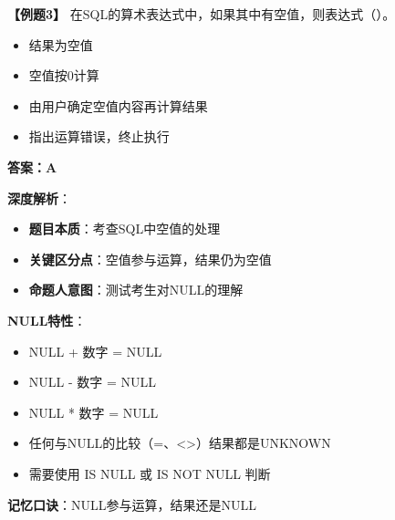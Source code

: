 \documentclass[12pt, a4paper]{article}
\newenvironment{bluebox}[1]{%
  \begin{trivlist}
  \item[\hskip\labelsep \textbf{#1}]
  \setlength{\parskip}{0.5ex}
  \setlength{\itemsep}{0.5ex}
}{%
  \end{trivlist}
}
\begin{document}
\begin{bluebox}{例题3：空值处理}
	\textbf{【例题3】} 在SQL的算术表达式中，如果其中有空值，则表达式（\quad）。

	\begin{itemize}
		\item[A)] 结果为空值
		\item[B)] 空值按0计算
		\item[C)] 由用户确定空值内容再计算结果
		\item[D)] 指出运算错误，终止执行
	\end{itemize}

	\textbf{答案：A}

	\textbf{深度解析}：

	\begin{itemize}
		\item \textbf{题目本质}：考查SQL中空值的处理
		\item \textbf{关键区分点}：空值参与运算，结果仍为空值
		\item \textbf{命题人意图}：测试考生对NULL的理解
	\end{itemize}

	\textbf{NULL特性}：
	\begin{itemize}
		\item NULL + 数字 = NULL
		\item NULL - 数字 = NULL
		\item NULL * 数字 = NULL
		\item 任何与NULL的比较（=、<>）结果都是UNKNOWN
		\item 需要使用 IS NULL 或 IS NOT NULL 判断
	\end{itemize}

	\textbf{记忆口诀}：NULL参与运算，结果还是NULL
\end{bluebox}
\end{document}
